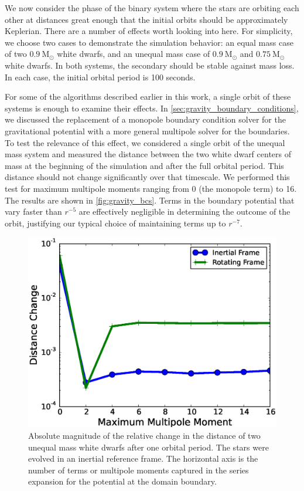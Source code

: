 \documentclass[iop,numberedappendix]{../emulateapj}
\newcommand{\msolar}{\mathrm{M}_\odot}
\begin{document}
We now consider the phase of the binary system where the stars are orbiting each other 
at distances great enough that the initial orbits should be approximately Keplerian. 
There are a number of effects worth looking into here. For simplicity, we choose two 
cases to demonstrate the simulation behavior: an equal mass case of two $0.9\ \msolar$ 
white dwarfs, and an unequal mass case of $0.9\ \msolar$ and $0.75\ \msolar$ white dwarfs.
In both systems, the secondary should be stable against mass loss.
In each case, the initial orbital period is 100 seconds.

For some of the algorithms described earlier in this work, a single orbit of these 
systems is enough to examine their effects. In \autoref{sec:gravity_boundary_conditions},
we discussed the replacement of a monopole boundary condition solver for the gravitational 
potential with a more general multipole solver for the boundaries. To test the relevance 
of this effect, we considered a single orbit of the unequal mass system and measured 
the distance between the two white dwarf centers of mass at the beginning of the simulation and after 
the full orbital period. This distance should not change significantly over that timescale.
We performed this test for maximum multipole moments ranging from 0 (the monopole term) to 16.
The results are shown in \autoref{fig:gravity_bcs}. Terms in the boundary potential 
that vary faster than $r^{-5}$ are effectively negligible in determining the outcome of the orbit, 
justifying our typical choice of maintaining terms up to $r^{-7}$.

\begin{figure}
  \centering
  \includegraphics[scale=0.45]{plots/gravity_bcs}
  \caption{Absolute magnitude of the relative change in the distance of two unequal mass white dwarfs after one orbital period. 
           The stars were evolved in an inertial reference frame. The horizontal axis is the number of terms or multipole moments 
           captured in the series expansion for the potential at the domain boundary.\label{fig:gravity_bcs}}
\end{figure}
\end{document}
